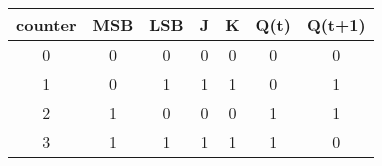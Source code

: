 \begin{tabular}{|c|c|c|c|c|c|c|}                     
\hline counter & MSB & LSB & J & K & Q(t) & Q(t+1) \\                                                    
\hline 0 & 0 & 0 & 0 & 0 & 0 & 0 \\                  
\hline 1 & 0 & 1 & 1 & 1 & 0 & 1 \\                 
\hline 2 & 1 & 0 & 0 & 0 & 1 & 1 \\                 
\hline 3 & 1 & 1 & 1 & 1 & 1 & 0 \\                  
\hline                                               
\end{tabular}                                      
